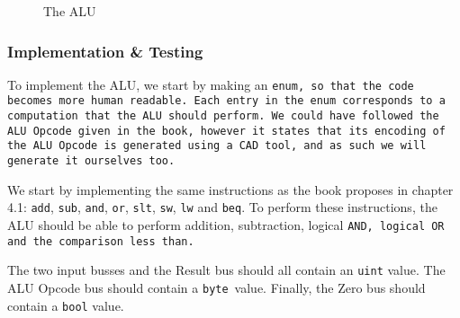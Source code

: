 \begin{figure}
    \centering
    \caption{The ALU}
    \label{fig:alu}
\end{figure}

\subsubsection*{Implementation \& Testing}
To implement the ALU, we start by making an \tt{enum}, so that the code becomes
more human readable. Each entry in the \tt{enum} corresponds to a computation
that the ALU should perform. We could have followed the ALU Opcode given in the
book\cite{ref:ark}, however it states that its encoding of the ALU Opcode is
generated using a CAD tool, and as such we will generate it ourselves too.

We start by implementing the same instructions as the book\cite{ref:ark}
proposes in chapter 4.1: \texttt{add}, \texttt{sub}, \texttt{and}, \texttt{or},
\texttt{slt}, \texttt{sw}, \texttt{lw} and \texttt{beq}. To perform these
instructions, the ALU should be able to perform addition, subtraction, logical
\tt{AND}, logical \tt{OR} and the comparison less than.

The two input busses and the Result bus should all contain an \texttt{uint}
value. The ALU Opcode bus should contain a \texttt{byte} value. Finally, the
Zero bus should contain a \texttt{bool} value.

